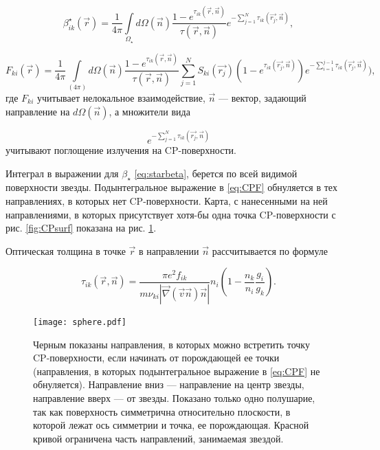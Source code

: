 \documentclass[12pt]{article}
\begin{document}
\begin{equation} \label{eq:starbeta}
\beta_{ik}^\star(\vec{r}) = \frac{1}{4\pi}\int\limits_{\Omega_\star} d\Omega(\vec{n})\frac{1-e^{\tau_{ik}(\vec{r},\vec{n})}}{\tau(\vec{r},\vec{n})}e^{-\sum_{j=1}^N\tau_{ik}(\vec{r_j},\vec{n})},
\end{equation}

\begin{equation} \label{eq:CPF}
F_{ki}(\vec{r}) = \frac{1}{4\pi}\int\limits_{(4\pi)} d\Omega(\vec{n})\frac{1-e^{\tau_{ik}(\vec{r},\vec{n})}}{\tau(\vec{r},\vec{n})}\sum\limits_{j=1}^N S_{ki}(\vec{r_j}) (1-e^{\tau_{ik}(\vec{r_j},\vec{n})}) e^{-\sum_{i=1}^{j-1}\tau_{ik}(\vec{r_j},\vec{n})}),
\end{equation}
где $F_{ki}$ учитывает нелокальное взаимодействие, $\vec{n}$ --- вектор, задающий направление на $d\Omega(\vec{n})$, а множители вида
 
 \[e^{-\sum_{j=1}^N\tau_{ik}(\vec{r_j},\vec{n})}\]
учитывают поглощение излучения на CP-поверхности.

Интеграл в выражении для $\beta_\star$ \eqref{eq:starbeta}, берется по всей видимой поверхности звезды. Подынтегральное выражение в \eqref{eq:CPF} обнуляется в тех направлениях, в которых нет CP-поверхности. Карта, с нанесенными на ней направлениями, в которых присутствует хотя-бы одна точка CP-поверхности с рис. \ref{fig:CPsurf} показана на рис. \ref{fig:CPmap}.  

Оптическая толщина в точке $\vec{r}$ в направлении $\vec{n}$ рассчитывается по формуле 

\begin{equation} \label{eq:optdepth}
\tau_{ik}(\vec{r},\vec{n}) = \frac{\pi e^2 f_{ik}}{m \nu_{ki} |\vec{\nabla} (\vec{v}\vec{n})\vec{n}|} n_i \left( 1 - \frac{n_k}{n_i}\frac{g_i}{g_k} \right).
\end{equation} 


\begin{figure}
\centering
\texttt{[image: sphere.pdf]}
\caption{Черным показаны направления, в которых можно встретить точку CP-поверхности, если начинать от порождающей ее точки (направления, в которых подынтегральное выражение в \eqref{eq:CPF} не обнуляется). Направление вниз --- направление на центр звезды, направление вверх --- от звезды. Показано только одно полушарие, так как поверхность симметрична относительно плоскости, в которой лежат ось симметрии и точка, ее порождающая. Красной кривой ограничена часть направлений, занимаемая звездой.}
\label{fig:CPmap}
\end{figure}
\end{document}

